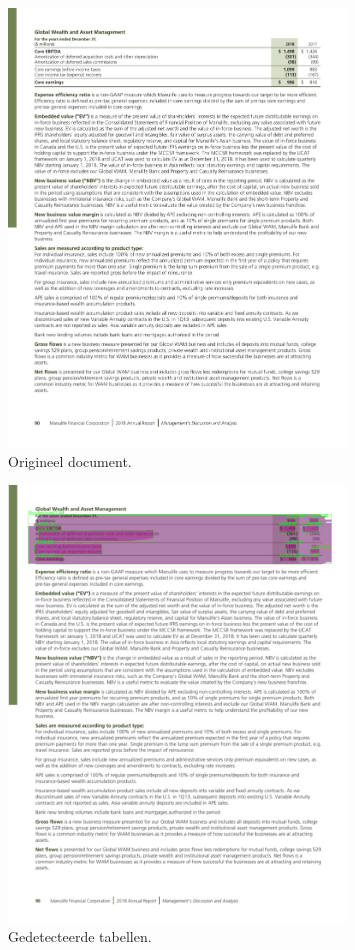 \begin{figure}[H]
    \centering
    \includegraphics[width=0.8\textwidth]{test-resultaten/8/original.jpg}
    \caption{Origineel document.}
\end{figure}

\begin{figure}[H]
    \centering
    \includegraphics[width=0.8\textwidth]{test-resultaten/8/detected_tables.png}
    \caption{Gedetecteerde tabellen.}
\end{figure}


